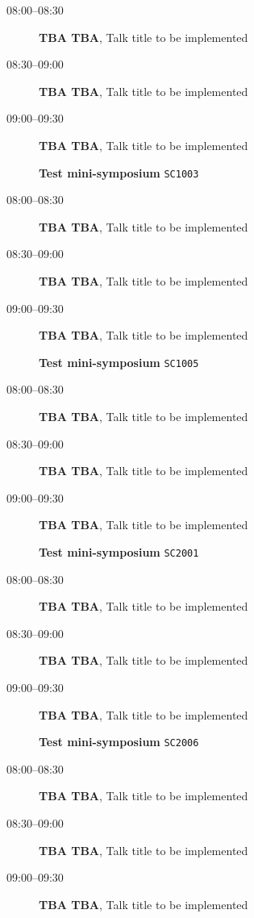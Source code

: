 \documentclass[ILAS2025-program.tex]{subfiles}
\begin{document}
\begin{description}
\begin{description}
    \item[08:00--08:30] \textbf{TBA TBA}, Talk title to be implemented
        \item[08:30--09:00] \textbf{TBA TBA}, Talk title to be implemented
        \item[09:00--09:30] \textbf{TBA TBA}, Talk title to be implemented
        \end{description}
    \begin{description}
    \item[] \textbf{Test mini-symposium} {\footnotesize\texttt{SC1003}}
    \item[08:00--08:30] \textbf{TBA TBA}, Talk title to be implemented
        \item[08:30--09:00] \textbf{TBA TBA}, Talk title to be implemented
        \item[09:00--09:30] \textbf{TBA TBA}, Talk title to be implemented
        \end{description}
    \begin{description}
    \item[] \textbf{Test mini-symposium} {\footnotesize\texttt{SC1005}}
    \item[08:00--08:30] \textbf{TBA TBA}, Talk title to be implemented
        \item[08:30--09:00] \textbf{TBA TBA}, Talk title to be implemented
        \item[09:00--09:30] \textbf{TBA TBA}, Talk title to be implemented
        \end{description}
    \begin{description}
    \item[] \textbf{Test mini-symposium} {\footnotesize\texttt{SC2001}}
    \item[08:00--08:30] \textbf{TBA TBA}, Talk title to be implemented
        \item[08:30--09:00] \textbf{TBA TBA}, Talk title to be implemented
        \item[09:00--09:30] \textbf{TBA TBA}, Talk title to be implemented
        \end{description}
    \begin{description}
    \item[] \textbf{Test mini-symposium} {\footnotesize\texttt{SC2006}}
    \item[08:00--08:30] \textbf{TBA TBA}, Talk title to be implemented
        \item[08:30--09:00] \textbf{TBA TBA}, Talk title to be implemented
        \item[09:00--09:30] \textbf{TBA TBA}, Talk title to be implemented

\end{description}
\end{description}
\end{document}
